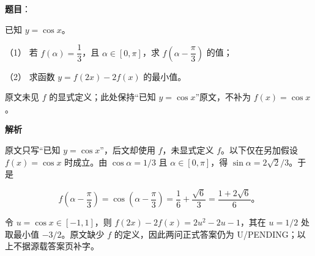 \begin{answer}

\textbf{题目}：

已知 $y=\cos x$。

（1） 若 $f(\alpha)=\dfrac13$，且 $\alpha\in[0,\pi]$，求 $f\left(\alpha-\dfrac\pi3\right)$ 的值；

（2） 求函数 $y=f(2x)-2f(x)$ 的最小值。

\begin{gktip}
原文未见 $f$ 的显式定义；此处保持“已知 $y=\cos x$”原文，不补为 $f(x)=\cos x$。
\end{gktip}

\textbf{解析}

原文只写“已知 $y=\cos x$”，后文却使用 $f$，未显式定义 $f$。以下仅在另加假设 $f(x)=\cos x$ 时成立。由 $\cos\alpha=1/3$ 且 $\alpha\in[0,\pi]$，得 $\sin\alpha=2\sqrt2/3$。于是


\nopagebreak[4]
\[
f\left(\alpha-\frac\pi3\right)
=\cos\left(\alpha-\frac\pi3\right)
=\frac16+\frac{\sqrt6}{3}
=\frac{1+2\sqrt6}{6}\text{。}
\]


令 $u=\cos x\in[-1,1]$，则 $f(2x)-2f(x)=2u^2-2u-1$，其在 $u=1/2$ 处取最小值 $-3/2$。原文缺少 $f$ 的定义，因此两问正式答案仍为 U/PENDING；以上不据源载答案页补字。



\end{answer}
